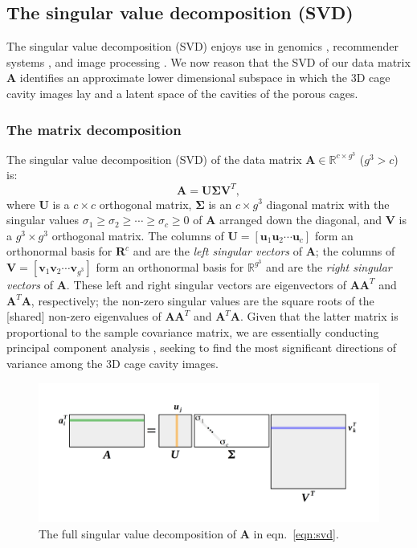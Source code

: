 \documentclass[journal=jacsat,manuscript=article,layout=traditional]{achemso}
\begin{document}
\subsection{The singular value decomposition (SVD)}
The singular value decomposition (SVD) \cite{muller2004singular,kalman1996singularly,strang1993introduction} enjoys use in genomics \cite{alter2000singular}, recommender systems \cite{koren2008factorization}, and image processing \cite{muller2004singular}. We now reason that the SVD of our data matrix $\mathbf{A}$ identifies an approximate lower dimensional subspace in which the 3D cage cavity images lay and a latent space of the cavities of the porous cages.

\subsubsection{The matrix decomposition}
The singular value decomposition (SVD) of the data matrix $\mathbf{A} \in \mathbb{R} ^{c \times g^3}$ ($g^3 > c$) is:
\begin{equation}
\mathbf{A}=\mathbf{U} \mathbf{\Sigma} \mathbf{V}^T,
\label{eqn:svd}
\end{equation} where $\mathbf{U}$ is a $c \times c$ orthogonal matrix, $\mathbf{\Sigma}$ is an $c\times g^3$ diagonal matrix with the singular values 
$\sigma_1 \geq \sigma_2 \geq \cdots \geq \sigma_{c} \geq 0$ of $\mathbf{A}$ arranged down the diagonal, and $\mathbf{V}$ is a $g^3 \times g^3$ orthogonal matrix. The columns of $\mathbf{U} = [\mathbf{u}_1 \mathbf{u}_2 \cdots \mathbf{u}_c]$ form an orthonormal basis for $\mathbf{R}^c$ and are the \emph{left singular vectors} of $\mathbf{A}$; the columns of $\mathbf{V}=[\mathbf{v}_1 \mathbf{v}_2 \cdots \mathbf{v}_{g^3}]$ form an orthonormal basis for $\mathbb{R}^{g^3}$ and are the \emph{right singular vectors} of $\mathbf{A}$. These left and right singular vectors are eigenvectors of $\mathbf{A}\mathbf{A}^T$ and $\mathbf{A}^T\mathbf{A}$, respectively; the non-zero singular values are the square roots of the [shared] non-zero eigenvalues of $\mathbf{A}\mathbf{A}^T$ and $\mathbf{A}^T\mathbf{A}$. Given that the latter matrix is proportional to the sample covariance matrix, we are essentially conducting principal component analysis \cite{strang1993introduction}, seeking to find the most significant directions of variance among the 3D cage cavity images.

\begin{figure}
\centering
	\includegraphics[width=0.75\columnwidth]{../svd.png}
	\caption{The full singular value decomposition of $\mathbf{A}$ in eqn.~\ref{eqn:svd}.
	} \label{fig:svd}
\end{figure}
\end{document}
